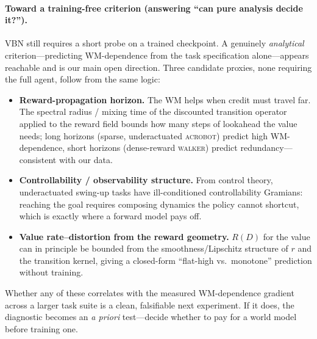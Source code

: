 \documentclass[twocolumn,10pt]{article}
\begin{document}
\paragraph{Toward a training-free criterion (answering ``can pure analysis
decide it?'').}
VBN still requires a short probe on a trained checkpoint. A genuinely
\emph{analytical} criterion---predicting WM-dependence from the task
specification alone---appears reachable and is our main open direction. Three
candidate proxies, none requiring the full agent, follow from the same logic:
\begin{itemize}\itemsep2pt
\item \textbf{Reward-propagation horizon.} The WM helps when credit must
travel far. The spectral radius / mixing time of the discounted transition
operator applied to the reward field bounds how many steps of lookahead the
value needs; long horizons (sparse, underactuated \textsc{acrobot}) predict
high WM-dependence, short horizons (dense-reward \textsc{walker}) predict
redundancy---consistent with our data.
\item \textbf{Controllability / observability structure.} From control theory,
underactuated swing-up tasks have ill-conditioned controllability Gramians:
reaching the goal requires composing dynamics the policy cannot shortcut,
which is exactly where a forward model pays off.
\item \textbf{Value rate--distortion from the reward geometry.} $R(D)$ for the
value can in principle be bounded from the smoothness/Lipschitz structure of
$r$ and the transition kernel, giving a closed-form ``flat-high vs.\ monotone''
prediction without training.
\end{itemize}
Whether any of these correlates with the measured WM-dependence gradient across
a larger task suite is a clean, falsifiable next experiment. If it does, the
diagnostic becomes an \emph{a priori} test---decide whether to pay for a world
model before training one.
\end{document}
